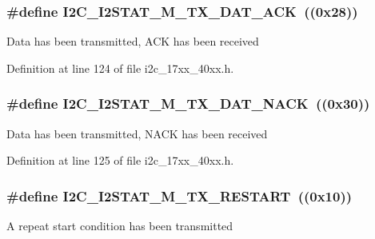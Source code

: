 \subsubsection[{\texorpdfstring{I2\+C\+\_\+\+I2\+S\+T\+A\+T\+\_\+\+M\+\_\+\+T\+X\+\_\+\+D\+A\+T\+\_\+\+A\+CK}{I2C_I2STAT_M_TX_DAT_ACK}}]{\setlength{\rightskip}{0pt plus 5cm}\#define I2\+C\+\_\+\+I2\+S\+T\+A\+T\+\_\+\+M\+\_\+\+T\+X\+\_\+\+D\+A\+T\+\_\+\+A\+CK~((0x28))}\hypertarget{group__I2C__17XX__40XX_gad8c325e3c58aa8e7810797b9a6761596}{}\label{group__I2C__17XX__40XX_gad8c325e3c58aa8e7810797b9a6761596}
Data has been transmitted, A\+CK has been received 

Definition at line 124 of file i2c\+\_\+17xx\+\_\+40xx.\+h.

\subsubsection[{\texorpdfstring{I2\+C\+\_\+\+I2\+S\+T\+A\+T\+\_\+\+M\+\_\+\+T\+X\+\_\+\+D\+A\+T\+\_\+\+N\+A\+CK}{I2C_I2STAT_M_TX_DAT_NACK}}]{\setlength{\rightskip}{0pt plus 5cm}\#define I2\+C\+\_\+\+I2\+S\+T\+A\+T\+\_\+\+M\+\_\+\+T\+X\+\_\+\+D\+A\+T\+\_\+\+N\+A\+CK~((0x30))}\hypertarget{group__I2C__17XX__40XX_ga234f86990a6fd63f1d2064cbca4709a3}{}\label{group__I2C__17XX__40XX_ga234f86990a6fd63f1d2064cbca4709a3}
Data has been transmitted, N\+A\+CK has been received 

Definition at line 125 of file i2c\+\_\+17xx\+\_\+40xx.\+h.

\subsubsection[{\texorpdfstring{I2\+C\+\_\+\+I2\+S\+T\+A\+T\+\_\+\+M\+\_\+\+T\+X\+\_\+\+R\+E\+S\+T\+A\+RT}{I2C_I2STAT_M_TX_RESTART}}]{\setlength{\rightskip}{0pt plus 5cm}\#define I2\+C\+\_\+\+I2\+S\+T\+A\+T\+\_\+\+M\+\_\+\+T\+X\+\_\+\+R\+E\+S\+T\+A\+RT~((0x10))}\hypertarget{group__I2C__17XX__40XX_gad41d0d1392b7d905b22b9c5015f2e48f}{}\label{group__I2C__17XX__40XX_gad41d0d1392b7d905b22b9c5015f2e48f}
A repeat start condition has been transmitted 

